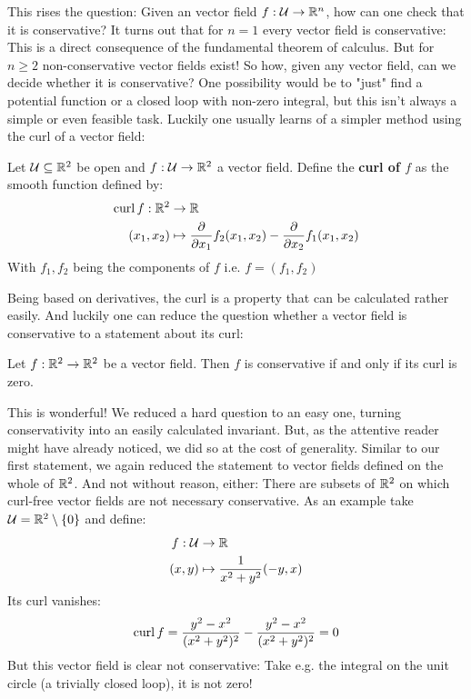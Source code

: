 This rises the question: Given an vector field $f: \mathcal{U} \to \mathbb{R}^n$, how can one check that it
is conservative? It turns out that for $n = 1$ every vector field is conservative: This is
a direct consequence of the fundamental theorem of calculus. But for $n \geq 2$ non-conservative vector
fields exist! So how, given any vector field, can we decide whether it is conservative? One possibility would
be to "just" find a potential function or a closed loop with non-zero integral, but this isn't always a simple
or even feasible task. Luckily one usually learns of a simpler method using the curl of a vector field:
\begin{definition}
	Let $\mathcal{U} \subseteq \mathbb{R}^2$ be open and $f: \mathcal{U} \to \mathbb{R}^2$ a vector field. Define the \textbf{curl of $f$} as
	the smooth function defined by:
	\begin{align*}
		\operatorname{curl} f: \mathbb{R}^2 &\to \mathbb{R} \\
		 (x_1, x_2)
			&\mapsto \frac{\partial}{\partial x_1} f_2(x_1, x_2) - \frac{\partial}{\partial x_2} f_1(x_1, x_2)
	\end{align*}
	With $f_1, f_2$ being the components of $f$ i.e. $f = (f_1, f_2)$
\end{definition}
Being based on derivatives, the curl is a property that can be calculated rather easily. And luckily one
can reduce the question whether a vector field is conservative to a statement about its curl:
\begin{lemma}
Let $f: \mathbb{R}^2 \to \mathbb{R}^2$ be a vector field. Then $f$ is conservative if and only if its curl is zero.
\end{lemma}

This is wonderful! We reduced a hard question to an easy one, turning conservativity into an easily calculated
invariant. But, as the attentive reader might have already noticed, we did so at the cost of generality.
Similar to our first statement, we again reduced the statement to vector fields defined on the whole of
$\mathbb{R}^2$. And not without reason, either: There are subsets of $\mathbb{R}^2$ on which curl-free vector fields are
not necessary conservative. As an example take $\mathcal{U} = \mathbb{R}^2 \setminus \{0\}$ and define:
\begin{align*}
	f: \mathcal{U} &\to \mathbb{R} \\
		(x, y) &\mapsto \frac{1}{x^2 + y^2}(-y, x)
\end{align*}
Its curl vanishes:
\begin{align*}
	\operatorname{curl} f = \frac{y^2 - x^2}{(x^2 + y^2)^2} - \frac{y^2 - x^2}{(x^2 + y^2)^2} = 0
\end{align*}
But this vector field is clear not conservative: Take e.g. the integral on the unit circle (a trivially closed
loop), it is not zero!


